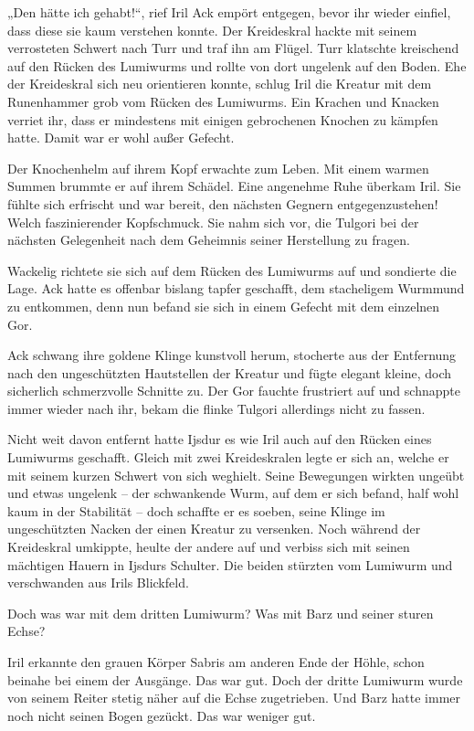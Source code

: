 „Den hätte ich gehabt!“, rief Iril Ack empört entgegen, bevor ihr wieder einfiel, dass diese sie kaum verstehen konnte. Der Kreideskral hackte mit seinem verrosteten Schwert nach Turr und traf ihn am Flügel. Turr klatschte kreischend auf den Rücken des Lumiwurms und rollte von dort ungelenk auf den Boden. Ehe der Kreideskral sich neu orientieren konnte, schlug Iril die Kreatur mit dem Runenhammer grob vom Rücken des Lumiwurms. Ein Krachen und Knacken verriet ihr, dass er mindestens mit einigen gebrochenen Knochen zu kämpfen hatte. Damit war er wohl außer Gefecht.

Der Knochenhelm auf ihrem Kopf erwachte zum Leben. Mit einem warmen Summen brummte er auf ihrem Schädel. Eine angenehme Ruhe überkam Iril. Sie fühlte sich erfrischt und war bereit, den nächsten Gegnern entgegenzustehen! Welch faszinierender Kopfschmuck. Sie nahm sich vor, die Tulgori bei der nächsten Gelegenheit nach dem Geheimnis seiner Herstellung zu fragen.

Wackelig richtete sie sich auf dem Rücken des Lumiwurms auf und sondierte die Lage. Ack hatte es offenbar bislang tapfer geschafft, dem stacheligem Wurmmund zu entkommen, denn nun befand sie sich in einem Gefecht mit dem einzelnen Gor.

Ack schwang ihre goldene Klinge kunstvoll herum, stocherte aus der Entfernung nach den ungeschützten Hautstellen der Kreatur und fügte elegant kleine, doch sicherlich schmerzvolle Schnitte zu. Der Gor fauchte frustriert auf und schnappte immer wieder nach ihr, bekam die flinke Tulgori allerdings nicht zu fassen.

Nicht weit davon entfernt hatte Ijsdur es wie Iril auch auf den Rücken eines Lumiwurms geschafft. Gleich mit zwei Kreideskralen legte er sich an, welche er mit seinem kurzen Schwert von sich weghielt. Seine Bewegungen wirkten ungeübt und etwas ungelenk – der schwankende Wurm, auf dem er sich befand, half wohl kaum in der Stabilität – doch schaffte er es soeben, seine Klinge im ungeschützten Nacken der einen Kreatur zu versenken. Noch während der Kreideskral umkippte, heulte der andere auf und verbiss sich mit seinen mächtigen Hauern in Ijsdurs Schulter. Die beiden stürzten vom Lumiwurm und verschwanden aus Irils Blickfeld.

Doch was war mit dem dritten Lumiwurm? Was mit Barz und seiner sturen Echse?

Iril erkannte den grauen Körper Sabris am anderen Ende der Höhle, schon beinahe bei einem der Ausgänge. Das war gut. Doch der dritte Lumiwurm wurde von seinem Reiter stetig näher auf die Echse zugetrieben. Und Barz hatte immer noch nicht seinen Bogen gezückt. Das war weniger gut.

